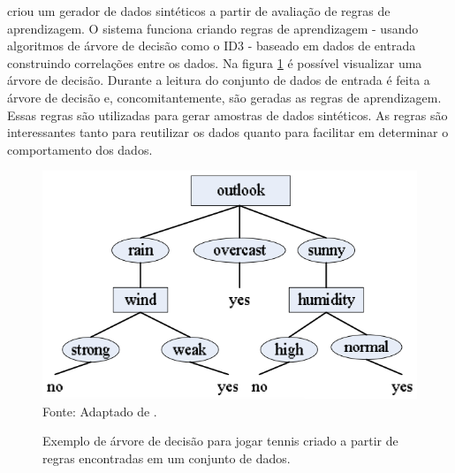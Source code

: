 \documentclass[
	12pt,				%
	openright,			%
	oneside,			%
	a4paper,			%
	english,			%
	brazil				%
	]{abntex2}
\begin{document}
		\cite{liu2016synthetic} criou um gerador de dados sintéticos a partir de avaliação de regras de aprendizagem. O sistema funciona criando regras de aprendizagem - usando algoritmos de árvore de decisão como o ID3 - baseado em dados de entrada construindo correlações entre os dados. Na figura \ref{fig:liu} é possível visualizar uma árvore de decisão. Durante a leitura do conjunto de dados de entrada é feita a árvore de decisão e, concomitantemente, são geradas as regras de aprendizagem. Essas regras são utilizadas para gerar amostras de dados sintéticos. As regras são interessantes tanto para reutilizar os dados quanto para facilitar em determinar o comportamento dos dados.
		\begin{figure}[h!]
			\centering
			\caption{Exemplo de árvore de decisão para jogar tennis criado a partir de regras encontradas em um conjunto de dados.}
			\includegraphics[width=\linewidth]{./figures/TrabalhosRelacionados/Liu13.png}
			\label{fig:liu}
			\footnotesize Fonte: Adaptado de \cite{liu2016synthetic}.
		\end{figure}
\end{document}
